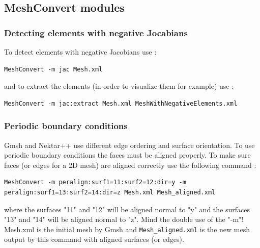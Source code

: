 \subsection{MeshConvert modules}
\subsubsection{Detecting elements with negative Jocabians}
To detect elements with negative Jacobians use :
\begin{lstlisting}[style=XmlStyle]
MeshConvert -m jac Mesh.xml
\end{lstlisting}
and to extract the elements (in order to visualize them for example) use :
\begin{lstlisting}[style=XmlStyle]
MeshConvert -m jac:extract Mesh.xml MeshWithNegativeElements.xml
\end{lstlisting}
\subsubsection{Periodic boundary conditions}
Gmsh and Nektar++ use different edge ordering and surface orientation. To use periodic boundary conditions the faces must be aligned properly. To make sure faces (or edges for a 2D mesh) are aligned correctly use the following command :
\begin{lstlisting}[style=XmlStyle]
MeshConvert -m peralign:surf1=11:surf2=12:dir=y -m peralign:surf1=13:surf2=14:dir=z Mesh.xml Mesh_aligned.xml
\end{lstlisting}
where the surfaces "11" and "12" will be aligned normal to "y" and the surfaces "13" and "14" will be aligned normal to "z". Mind the double use of the "-m"! Mesh.xml is the initial mesh by Gmsh and \verb+Mesh_aligned.xml+ is the new mesh output by this command with aligned surfaces (or edges).
